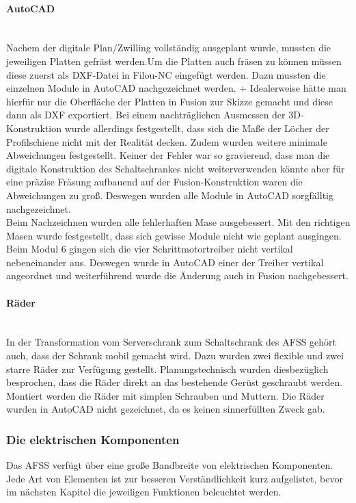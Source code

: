     \paragraph{AutoCAD}\mbox{}\\
    \label{AutoCAD}
    Nachem der digitale Plan/Zwilling vollständig ausgeplant wurde, mussten die jeweiligen Platten gefräst werden.Um die Platten auch fräsen zu können müssen diese zuerst als DXF-Datei in Filou-NC eingefügt werden. Dazu mussten die einzelnen Module in AutoCAD nachgezeichnet werden.     
+
    Idealerweise hätte man hierfür nur die Oberfläche der Platten in Fusion zur Skizze gemacht und diese dann als DXF exportiert. Bei einem nachträglichen Ausmessen der 3D-Konstruktion wurde allerdings festgestellt, dass sich die Maße der Löcher der Profilschiene nicht mit der Realität decken. Zudem wurden weitere minimale Abweichungen festgestellt. Keiner der Fehler war so gravierend, dass man die digitale Konstruktion des Schaltschrankes nicht weiterverwenden könnte aber für eine präzise Fräsung aufbauend auf der Fusion-Konstruktion waren die Abweichungen zu groß. Deswegen wurden alle Module in AutoCAD sorgfälltig nachgezeichnet.\\     
    Beim Nachzeichnen wurden alle fehlerhaften Mase ausgebessert. Mit den richtigen Masen wurde festgestellt, dass sich gewisse Module nicht wie geplant ausgingen. Beim Modul 6 gingen sich die vier Schrittmotortreiber nicht vertikal nebeneinander aus. Deswegen wurde in AutoCAD einer der Treiber vertikal angeordnet und weiterführend wurde die Änderung auch in Fusion nachgebessert.
    \paragraph{Räder}\mbox{}\\
    In der Transformation vom Serverschrank zum Schaltschrank des AFSS gehört auch, dass der Schrank mobil gemacht wird. Dazu wurden zwei flexible und zwei starre Räder zur Verfügung gestellt. Planungstechnisch wurden diesbezüglich besprochen, dass die Räder direkt an das bestehende Gerüst geschraubt werden. Montiert werden die Räder mit simplen Schrauben und Muttern. Die Räder wurden in AutoCAD nicht gezeichnet, da es keinen sinnerfüllten Zweck gab. 
    \newpage
\subsubsection{Die elektrischen Komponenten}
\label{sec:Die elektrischen Komponenten}
    Das AFSS verfügt über eine große  Bandbreite von elektrischen Komponenten. Jede Art von Elementen ist zur besseren Verständlichkeit kurz aufgelistet, bevor im nächsten Kapitel die jeweiligen Funktionen beleuchtet werden.
